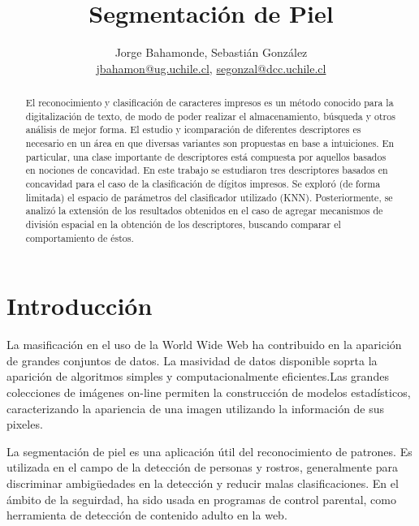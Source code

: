 \documentclass[12pt]{article}
\title{Segmentación de Piel}
\author{Jorge Bahamonde, Sebastián González\\
\small{\url{jbahamon@ug.uchile.cl}, \url{segonzal@dcc.uchile.cl}}}
\date{}
\begin{document}
\maketitle

\begin{abstract}
    El reconocimiento y clasificación de caracteres impresos es un método
    conocido para la digitalización de texto, de modo de poder realizar el
    almacenamiento, búsqueda y otros análisis de mejor forma.  El estudio y
    icomparación de diferentes descriptores es necesario en un área en que
    diversas variantes son propuestas en base a intuiciones. En particular, una
    clase importante de descriptores está compuesta por aquellos basados en
    nociones de concavidad. En este trabajo se estudiaron tres descriptores
    basados en concavidad para el caso de la clasificación de dígitos impresos.
    Se exploró (de forma limitada) el espacio de parámetros del clasificador
    utilizado (KNN). Posteriormente, se analizó la extensión de los resultados
    obtenidos en el caso de agregar mecanismos de división espacial en la
    obtención de los descriptores, buscando comparar el comportamiento de éstos.
\end{abstract}

\section{Introducción}


La masificación en el uso de la World Wide Web ha contribuido en la aparición de
grandes conjuntos de datos. La masividad de datos disponible soprta la aparición
de algoritmos simples y computacionalmente eficientes.Las grandes colecciones de
imágenes on-line permiten la construcción de modelos estadísticos,
caracterizando la apariencia de una imagen utilizando la información de sus
pixeles.

La segmentación de piel es una aplicación útil del reconocimiento de patrones.
Es utilizada en el campo de la detección de personas y rostros, generalmente
para discriminar ambigüedades en la detección y reducir malas clasificaciones.
En el ámbito de la seguirdad, ha sido usada en programas de control parental,
como herramienta de detección de contenido adulto en la web.
\end{document}

